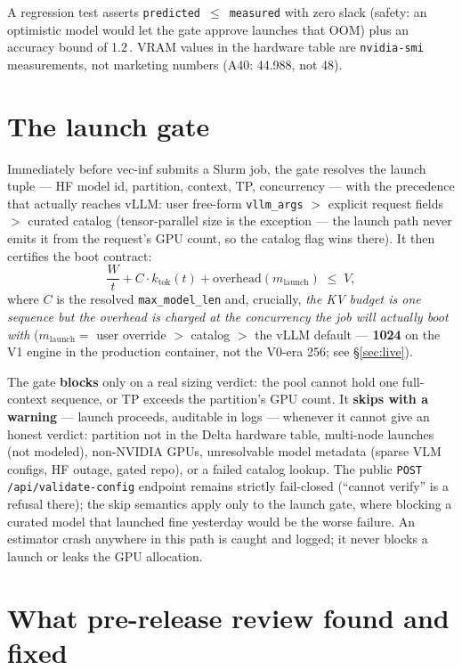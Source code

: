 \documentclass[11pt]{article}
\newcommand{\code}[1]{\texttt{#1}}
\newcommand{\gib}{\,\text{GiB}}
\begin{document}
\noindent
A regression test asserts \code{predicted}~$\le$~\code{measured} with zero
slack (safety: an optimistic model would let the gate approve launches that
OOM) plus an accuracy bound of 1.2\gib. VRAM values in the hardware table are
\code{nvidia-smi} measurements, not marketing numbers (A40: 44.988, not 48).

\section{The launch gate}

Immediately before vec-inf submits a Slurm job, the gate resolves the launch
tuple --- HF model id, partition, context, TP, concurrency --- with the
precedence that actually reaches vLLM: user free-form \code{vllm\_args}
$>$ explicit request fields $>$ curated catalog (tensor-parallel size is the
exception --- the launch path never emits it from the request's GPU count, so
the catalog flag wins there). It then certifies the boot contract:
\begin{equation}
\frac{W}{t} + C \cdot k_{\text{tok}}(t) + \text{overhead}(m_{\text{launch}}) \;\le\; V ,
\end{equation}
where $C$ is the resolved \code{max\_model\_len} and, crucially,
\emph{the KV budget is one sequence but the overhead is charged at the
concurrency the job will actually boot with}
($m_{\text{launch}} = $ user override $>$ catalog $>$ the vLLM default ---
\textbf{1024} on the V1 engine in the production container, not the V0-era
256; see \S\ref{sec:live}).

The gate \textbf{blocks} only on a real sizing verdict: the pool cannot hold
one full-context sequence, or TP exceeds the partition's GPU count. It
\textbf{skips with a warning} --- launch proceeds, auditable in logs --- whenever
it cannot give an honest verdict: partition not in the Delta hardware table,
multi-node launches (not modeled), non-NVIDIA GPUs, unresolvable model
metadata (sparse VLM configs, HF outage, gated repo), or a failed catalog
lookup. The public \code{POST /api/validate-config} endpoint remains strictly
fail-closed (``cannot verify'' is a refusal there); the skip semantics apply
only to the launch gate, where blocking a curated model that launched fine
yesterday would be the worse failure. An estimator crash anywhere in this path
is caught and logged; it never blocks a launch or leaks the GPU allocation.

\section{What pre-release review found and fixed}
\end{document}
